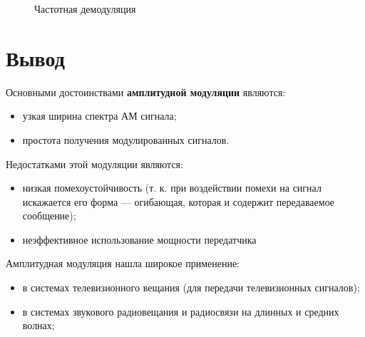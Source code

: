 \documentclass[12pt,a4paper]{scrartcl}
\begin{document}
\begin{figure}[h!]
\caption{Частотная демодуляция}
\end{figure}

\clearpage
\newpage

\section{Вывод}
\label{sec:afterWork}

 Основными достоинствами \textbf{амплитудной модуляции} являются:

 \begin{itemize}
    \item  узкая ширина спектра АМ сигнала;
    \item  простота получения модулированных сигналов.
 \end{itemize}
    
Недостатками этой модуляции являются:

\begin{itemize}
    \item   низкая помехоустойчивость (т. к. при воздействии помехи на сигнал искажается его форма — огибающая, которая и содержит передаваемое сообщение);
    \item  неэффективное использование мощности передатчика
 \end{itemize}
   
Амплитудная модуляция нашла широкое применение:

\begin{itemize}
    \item в системах телевизионного вещания (для передачи телевизионных сигналов);
    \item в системах звукового радиовещания и радиосвязи на длинных и средних волнах;
 \end{itemize}
 
\end{document}
